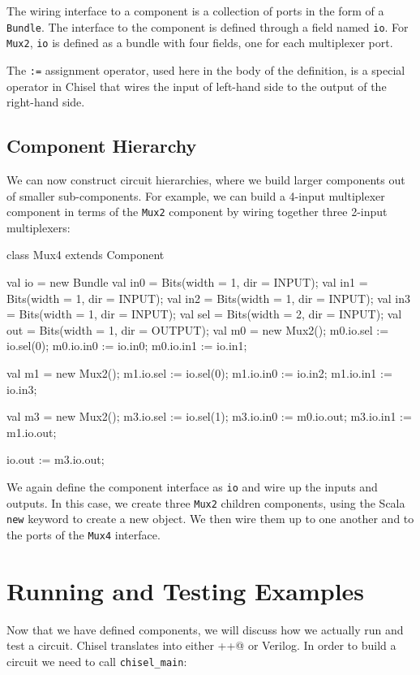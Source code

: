 \documentclass[10pt]{article}
\def\code#1{{\tt #1}}
\begin{document}
\noindent
The wiring interface to a component is a collection of ports in the
form of a \code{Bundle}.  The interface to the component is defined
through a field named \code{io}.  For \code{Mux2}, \code{io} is
defined as a bundle with four fields, one for each multiplexer port.

The \code{:=} assignment operator, used here in the body of the
definition, is a special operator in Chisel that wires the input of
left-hand side to the output of the right-hand side.

\subsection{Component Hierarchy}

We can now construct circuit hierarchies, where we build larger components out
of smaller sub-components.  For example, we can build a 4-input
multiplexer component in terms of the \code{Mux2} component by wiring
together three 2-input multiplexers:

\begin{scala}
class Mux4 extends Component {
  val io = new Bundle {
    val in0 = Bits(width = 1, dir = INPUT);
    val in1 = Bits(width = 1, dir = INPUT);
    val in2 = Bits(width = 1, dir = INPUT);
    val in3 = Bits(width = 1, dir = INPUT);
    val sel = Bits(width = 2, dir = INPUT);
    val out = Bits(width = 1, dir = OUTPUT);
  }
  val m0 = new Mux2();
  m0.io.sel := io.sel(0); m0.io.in0 := io.in0; m0.io.in1 := io.in1;

  val m1 = new Mux2();
  m1.io.sel := io.sel(0); m1.io.in0 := io.in2; m1.io.in1 := io.in3;

  val m3 = new Mux2();
  m3.io.sel := io.sel(1); m3.io.in0 := m0.io.out; m3.io.in1 := m1.io.out;

  io.out := m3.io.out;
}
\end{scala}

\noindent
We again define the component interface as \code{io} and wire up the
inputs and outputs.  In this case, we create three \code{Mux2}
children components, using the Scala \code{new} keyword to create a
new object.  We then wire them up to one another and to the ports of
the \code{Mux4} interface.

\section{Running and Testing Examples}

Now that we have defined components, we will discuss how we actually run and test a circuit.  Chisel translates into either \verb@C++@ or Verilog.   In order to build a circuit we need to call \code{chisel\_main}:
\end{document}
